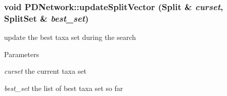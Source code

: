 \hypertarget{classPDNetwork_a684fdd0cfd902a037bb8ce0bb6846a43}{
\subsubsection[{updateSplitVector}]{\setlength{\rightskip}{0pt plus 5cm}void PDNetwork::updateSplitVector ({\bf Split} \& {\em curset}, \/  {\bf SplitSet} \& {\em best\_\-set})}}
\label{classPDNetwork_a684fdd0cfd902a037bb8ce0bb6846a43}
update the best taxa set during the search 
\begin{DoxyParams}{Parameters}
\item[{\em curset}]the current taxa set \item[{\em best\_\-set}]the list of best taxa set so far \end{DoxyParams}


